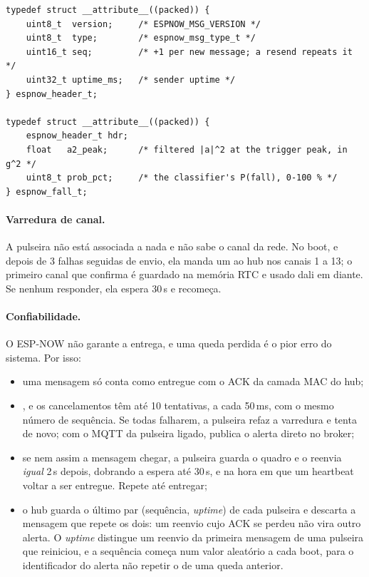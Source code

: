 \begin{lstlisting}[style=c]
typedef struct __attribute__((packed)) {
    uint8_t  version;     /* ESPNOW_MSG_VERSION */
    uint8_t  type;        /* espnow_msg_type_t */
    uint16_t seq;         /* +1 per new message; a resend repeats it */
    uint32_t uptime_ms;   /* sender uptime */
} espnow_header_t;

typedef struct __attribute__((packed)) {
    espnow_header_t hdr;
    float   a2_peak;      /* filtered |a|^2 at the trigger peak, in g^2 */
    uint8_t prob_pct;     /* the classifier's P(fall), 0-100 % */
} espnow_fall_t;
\end{lstlisting}

\paragraph{Varredura de canal.} A pulseira não está associada a nada e não sabe o canal da
rede. No boot, e depois de 3 falhas seguidas de envio, ela manda um  ao hub nos
canais 1 a 13; o primeiro canal que confirma é guardado na memória RTC e usado dali em
diante. Se nenhum responder, ela espera 30\,s e recomeça.

\paragraph{Confiabilidade.} O ESP-NOW não garante a entrega, e uma queda perdida é o pior
erro do sistema. Por isso:
\begin{itemize}
  \item uma mensagem só conta como entregue com o ACK da camada MAC do hub;
  \item {},  e os cancelamentos têm até 10 tentativas, a cada 50\,ms, com o
        mesmo número de sequência. Se todas falharem, a pulseira refaz a varredura e tenta de novo;
        com o MQTT da pulseira ligado, publica o alerta direto no broker;
  \item se nem assim a mensagem chegar, a pulseira guarda o quadro e o reenvia \emph{igual}
        2\,s depois, dobrando a espera até 30\,s, e na hora em que um heartbeat voltar a ser
        entregue. Repete até entregar;
  \item o hub guarda o último par (sequência, \textit{uptime}) de cada pulseira e descarta a
        mensagem que repete os dois: um reenvio cujo ACK se perdeu não vira outro alerta. O
        \textit{uptime} distingue um reenvio da primeira mensagem de uma pulseira que
        reiniciou, e a sequência começa num valor aleatório a cada boot, para o
        identificador do alerta não repetir o de uma queda anterior.
\end{itemize}

